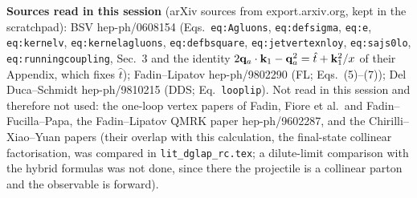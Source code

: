 \medskip
\noindent\textbf{Sources read in this session} (arXiv sources from export.arxiv.org, kept in the scratchpad): BSV hep-ph/0608154 (Eqs.~\texttt{eq:Agluons}, \texttt{eq:defsigma}, \texttt{eq:e}, \texttt{eq:kernelv}, \texttt{eq:kernelagluons}, \texttt{eq:defbsquare}, \texttt{eq:jetvertexnloy}, \texttt{eq:sajs0lo}, \texttt{eq:runningcoupling}, Sec.~3 and the identity $2\mathbf{q}_a\cdot\mathbf{k}_1-\mathbf{q}_a^2=\hat t+\mathbf{k}_1^2/x$ of their Appendix, which fixes $\hat t$); Fadin--Lipatov hep-ph/9802290 (FL; Eqs.~(5)--(7)); Del Duca--Schmidt hep-ph/9810215 (DDS; Eq.~\texttt{looplip}). Not read in this session and therefore not used: the one-loop vertex papers of Fadin, Fiore et al.\ and Fadin--Fucilla--Papa, the Fadin--Lipatov QMRK paper hep-ph/9602287, and the Chirilli--Xiao--Yuan papers (their overlap with this calculation, the final-state collinear factorisation, was compared in \texttt{lit\_dglap\_rc.tex}; a dilute-limit comparison with the hybrid formulas was not done, since there the projectile is a collinear parton and the observable is forward).

